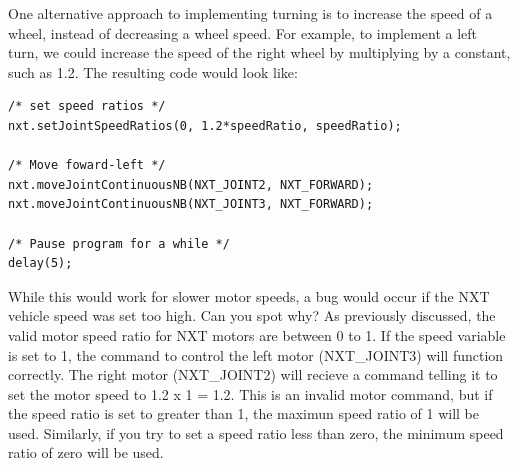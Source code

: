 \documentclass[11pt]{article}
\begin{document}
One alternative approach to implementing turning is to increase the speed of a 
wheel, instead of decreasing a wheel speed. For example, to implement a left 
turn, we could increase the speed of the right wheel by multiplying by a constant, 
such as 1.2.  The resulting code would look like:
\begin{lstlisting}
/* set speed ratios */
nxt.setJointSpeedRatios(0, 1.2*speedRatio, speedRatio);

/* Move foward-left */
nxt.moveJointContinuousNB(NXT_JOINT2, NXT_FORWARD);
nxt.moveJointContinuousNB(NXT_JOINT3, NXT_FORWARD);

/* Pause program for a while */
delay(5);
\end{lstlisting}
While this would work for slower motor speeds, a bug would occur if the NXT 
vehicle speed was set too high. Can you spot why? As previously discussed, the 
valid motor speed ratio for NXT motors are between 0 to 1. If the speed variable 
is set to 1, the command to control the left motor (NXT\_JOINT3) will function 
correctly. The right motor (NXT\_JOINT2) will recieve a command telling it to 
set the motor speed to 1.2 x 1 = 1.2. This is an invalid motor command, but if 
the speed ratio is set to greater than 1, the maximun speed ratio of 1 will be
used. Similarly, if you try to set a speed ratio less than zero, the minimum 
speed ratio of zero will be used.\\
\end{document}
